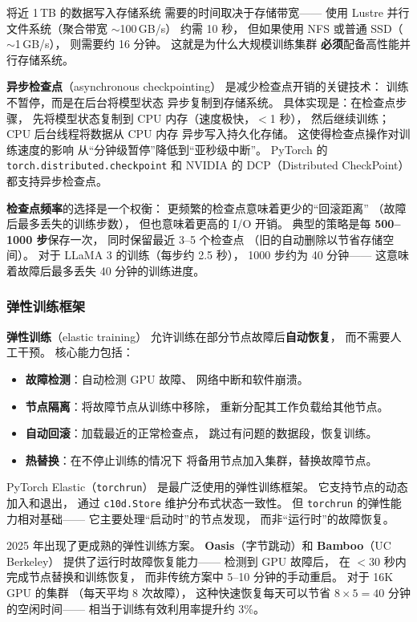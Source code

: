 将近 1\,TB 的数据写入存储系统
需要的时间取决于存储带宽——
使用 Lustre 并行文件系统（聚合带宽 $\sim$100\,GB/s）
约需 10 秒，
但如果使用 NFS 或普通 SSD（$\sim$1\,GB/s），
则需要约 16 分钟。
这就是为什么大规模训练集群
\textbf{必须}配备高性能并行存储系统。

\textbf{异步检查点}（asynchronous checkpointing）
是减少检查点开销的关键技术：
训练不暂停，而是在后台将模型状态
异步复制到存储系统。
具体实现是：在检查点步骤，
先将模型状态复制到 CPU 内存（速度极快，$<$1 秒），
然后继续训练；
CPU 后台线程将数据从 CPU 内存
异步写入持久化存储。
这使得检查点操作对训练速度的影响
从``分钟级暂停''降低到``亚秒级中断''。
PyTorch 的 \texttt{torch.distributed.checkpoint}
和 NVIDIA 的 DCP（Distributed CheckPoint）
都支持异步检查点。

\textbf{检查点频率}的选择是一个权衡：
更频繁的检查点意味着更少的``回滚距离''
（故障后最多丢失的训练步数），
但也意味着更高的 I/O 开销。
典型的策略是每 \textbf{500--1000 步}保存一次，
同时保留最近 3--5 个检查点
（旧的自动删除以节省存储空间）。
对于 LLaMA 3 的训练（每步约 2.5 秒），
1000 步约为 40 分钟——
这意味着故障后最多丢失 40 分钟的训练进度。

\subsubsection{弹性训练框架}

\textbf{弹性训练}（elastic training）
允许训练在部分节点故障后\textbf{自动恢复}，
而不需要人工干预。
核心能力包括：
\begin{itemize}[noitemsep]
  \item \textbf{故障检测}：自动检测 GPU 故障、
        网络中断和软件崩溃。
  \item \textbf{节点隔离}：将故障节点从训练中移除，
        重新分配其工作负载给其他节点。
  \item \textbf{自动回滚}：加载最近的正常检查点，
        跳过有问题的数据段，恢复训练。
  \item \textbf{热替换}：在不停止训练的情况下
        将备用节点加入集群，替换故障节点。
\end{itemize}

PyTorch Elastic（\texttt{torchrun}）
是最广泛使用的弹性训练框架。
它支持节点的动态加入和退出，
通过 \texttt{c10d.Store} 维护分布式状态一致性。
但 \texttt{torchrun} 的弹性能力相对基础——
它主要处理``启动时''的节点发现，
而非``运行时''的故障恢复。

2025 年出现了更成熟的弹性训练方案。
\textbf{Oasis}（字节跳动）和
\textbf{Bamboo}（UC Berkeley）
提供了运行时故障恢复能力——
检测到 GPU 故障后，
在 $<$30 秒内完成节点替换和训练恢复，
而非传统方案中 5--10 分钟的手动重启。
对于 16K GPU 的集群
（每天平均 8 次故障），
这种快速恢复每天可以节省
$8 \times 5 = 40$ 分钟的空闲时间——
相当于训练有效利用率提升约 3\%。

